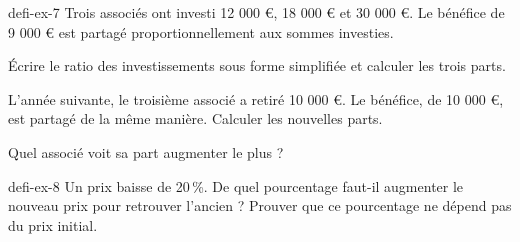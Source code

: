 \begin{blocEdition}{defi-ex-7}
Trois associés ont investi 12 000 €, 18 000 € et 30 000 €. Le bénéfice de 9 000 € est partagé proportionnellement aux sommes investies.\begin{questions}\item Écrire le ratio des investissements sous forme simplifiée et calculer les trois parts.\item L’année suivante, le troisième associé a retiré 10 000 €. Le bénéfice, de 10 000 €, est partagé de la même manière. Calculer les nouvelles parts.\item Quel associé voit sa part augmenter le plus ?\end{questions}\par{}\par\par{}\par{}\par{}\par{}\par{}\par{}
\end{blocEdition}
\begin{blocEdition}{defi-ex-8}
Un prix baisse de 20\,\%. De quel pourcentage faut-il augmenter le nouveau prix pour retrouver l’ancien ? Prouver que ce pourcentage ne dépend pas du prix initial.\par{}\par\par{}\par{}\par{}\par{}\par{}\par{}
\end{blocEdition}
